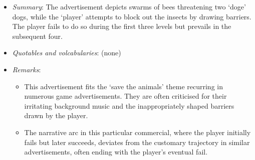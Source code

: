 \documentclass[a4paper, 12pt, mla]{homework}
\begin{document}
\begin{abibliography}
	\begin{itemize}
		\item \textit{Summary}:
			The advertisement depicts swarms of bees threatening two `doge' dogs, while the `player' attempts to block out the insects by drawing barriers. 
			The player fails to do so during the first three levels but prevails in the subsequent four.
		\item \textit{Quotables and volcabularies}: (none)
		\item \textit{Remarks}:
			\begin{itemize}
				\item This advertisement fits the `save the animals' theme recurring in numerous game advertisements. 
					They are often criticised for their irritating background music and the inappropriately shaped barriers drawn by the player.
				\item The narrative arc in this particular commercial, where the player initially fails but later succeeds, deviates from the customary trajectory in similar advertisements, often ending with the player's eventual fail.
			\end{itemize}
	\end{itemize}

\end{abibliography}
\end{document}
